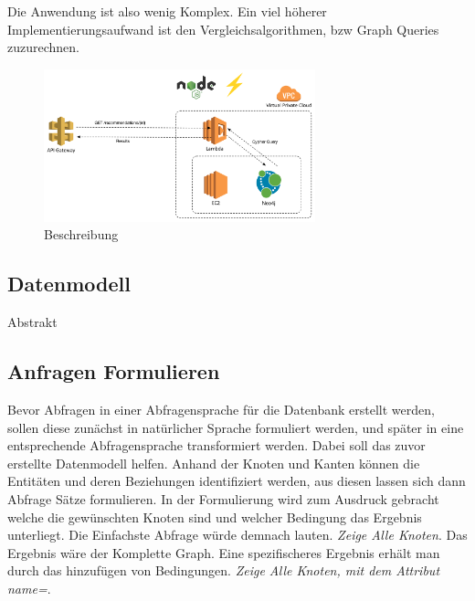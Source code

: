 Die Anwendung ist also wenig Komplex. Ein viel höherer Implementierungsaufwand ist den Vergleichsalgorithmen, bzw Graph Queries zuzurechnen. 

\begin{figure}[htb]
 \centering
 \includegraphics[width=0.7\textwidth,angle=0]{abb/Architecture}
 \caption[Beschreibung]{Beschreibung}
\label{fig:Beschreibung}
\end{figure}

\subsection{Datenmodell}

Abstrakt 
\subsection{Anfragen Formulieren}

Bevor Abfragen in einer Abfragensprache für die Datenbank erstellt werden, sollen diese zunächst in natürlicher Sprache formuliert werden, und später in eine entsprechende Abfragensprache  transformiert werden. Dabei soll das zuvor erstellte  Datenmodell helfen. Anhand der Knoten und Kanten können die Entitäten und deren Beziehungen identifiziert werden, aus diesen lassen sich dann Abfrage Sätze formulieren. In der Formulierung wird zum Ausdruck gebracht welche die gewünschten Knoten sind und welcher Bedingung das Ergebnis unterliegt. Die Einfachste Abfrage würde demnach lauten. \textit{Zeige Alle Knoten}. Das Ergebnis wäre der Komplette Graph. Eine spezifischeres Ergebnis erhält man durch das hinzufügen von Bedingungen. \textit{  Zeige Alle Knoten, mit dem Attribut {name=\textbf{\texttt{}}}}. 


